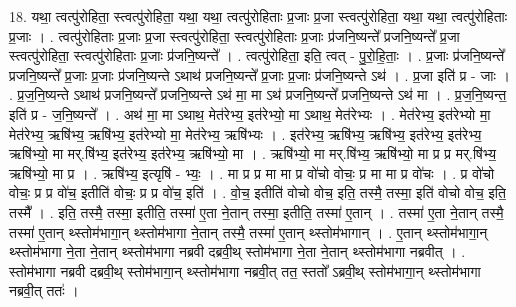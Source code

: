 \documentclass[17pt]{extarticle}
\begin{document}
18. यथा॒ त्वत्पु॑रोहिता॒ स्त्वत्पु॑रोहिता॒ यथा॒ यथा॒ त्वत्पु॑रोहिताः प्र॒जाः प्र॒जा स्त्वत्पु॑रोहिता॒ यथा॒ यथा॒ त्वत्पु॑रोहिताः प्र॒जाः । . त्वत्पु॑रोहिताः प्र॒जाः प्र॒जा स्त्वत्पु॑रोहिता॒ स्त्वत्पु॑रोहिताः प्र॒जाः प्र॑जनि॒ष्यन्ते᳚ प्रजनि॒ष्यन्ते᳚ प्र॒जा स्त्वत्पु॑रोहिता॒ स्त्वत्पु॑रोहिताः प्र॒जाः प्र॑जनि॒ष्यन्ते᳚ । . त्वत्पु॑रोहिता॒ इति॒ त्वत् - पु॒रो॒हि॒ताः॒ । . प्र॒जाः प्र॑जनि॒ष्यन्ते᳚ प्रजनि॒ष्यन्ते᳚ प्र॒जाः प्र॒जाः प्र॑जनि॒ष्यन्ते ऽथाथ॑ प्रजनि॒ष्यन्ते᳚ प्र॒जाः प्र॒जाः प्र॑जनि॒ष्यन्ते ऽथ॑ । . प्र॒जा इति॑ प्र - जाः । . प्र॒ज॒नि॒ष्यन्ते ऽथाथ॑ प्रजनि॒ष्यन्ते᳚ प्रजनि॒ष्यन्ते ऽथ॑ मा॒ मा ऽथ॑ प्रजनि॒ष्यन्ते᳚ प्रजनि॒ष्यन्ते ऽथ॑ मा । . प्र॒ज॒नि॒ष्यन्त॒ इति॑ प्र - ज॒नि॒ष्यन्ते᳚ । . अथ॑ मा॒ मा ऽथाथ॒ मेत॑रेभ्य॒ इत॑रेभ्यो॒ मा ऽथाथ॒ मेत॑रेभ्यः । . मेत॑रेभ्य॒ इत॑रेभ्यो मा॒ मेत॑रेभ्य॒ ऋषि॑भ्य॒ ऋषि॑भ्य॒ इत॑रेभ्यो मा॒ मेत॑रेभ्य॒ ऋषि॑भ्यः । . इत॑रेभ्य॒ ऋषि॑भ्य॒ ऋषि॑भ्य॒ इत॑रेभ्य॒ इत॑रेभ्य॒ ऋषि॑भ्यो॒ मा मर्.षि॑भ्य॒ इत॑रेभ्य॒ इत॑रेभ्य॒ ऋषि॑भ्यो॒ मा । . ऋषि॑भ्यो॒ मा मर्.षि॑भ्य॒ ऋषि॑भ्यो॒ मा प्र प्र मर्.षि॑भ्य॒ ऋषि॑भ्यो॒ मा प्र । . ऋषि॑भ्य॒ इत्यृषि॑ - भ्यः॒ । . मा प्र प्र मा मा प्र वो॑चो वोचः॒ प्र मा मा प्र वो॑चः । . प्र वो॑चो वोचः॒ प्र प्र वो॑च॒ इतीति॑ वोचः॒ प्र प्र वो॑च॒ इति॑ । . वो॒च॒ इतीति॑ वोचो वोच॒ इति॒ तस्मै॒ तस्मा॒ इति॑ वोचो वोच॒ इति॒ तस्मै᳚ । . इति॒ तस्मै॒ तस्मा॒ इतीति॒ तस्मा॑ ए॒ता ने॒तान् तस्मा॒ इतीति॒ तस्मा॑ ए॒तान् । . तस्मा॑ ए॒ता ने॒तान् तस्मै॒ तस्मा॑ ए॒तान् थ्स्तोम॑भागा॒न् थ्स्तोम॑भागा ने॒तान् तस्मै॒ तस्मा॑ ए॒तान् थ्स्तोम॑भागान् । . ए॒तान् थ्स्तोम॑भागा॒न् थ्स्तोम॑भागा ने॒ता ने॒तान् थ्स्तोम॑भागा नब्रवी दब्रवी॒थ् स्तोम॑भागा ने॒ता ने॒तान् थ्स्तोम॑भागा नब्रवीत् । . स्तोम॑भागा नब्रवी दब्रवी॒थ् स्तोम॑भागा॒न् थ्स्तोम॑भागा नब्रवी॒त् तत॒ स्ततो᳚ ऽब्रवी॒थ् स्तोम॑भागा॒न् थ्स्तोम॑भागा नब्रवी॒त् ततः॑ । \newline
\end{document}
